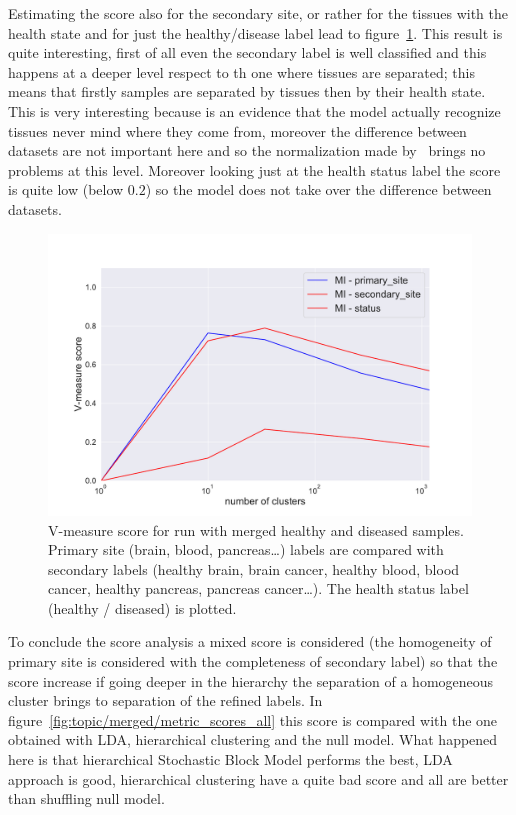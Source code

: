 Estimating the score also for the secondary site, or rather for the tissues with the health state and for just the healthy/disease label lead to figure~\ref{fig:topic/merged/metric_scores}. This result is quite interesting, first of all even the secondary label is well classified and this happens at a deeper level respect to th one where tissues are separated; this means that firstly samples are separated by tissues then by their health state. This is very interesting because is an evidence that the model actually recognize tissues never mind where they come from, moreover the difference between datasets are not important here and so the normalization made by~\cite{Betel2018} brings no problems at this level. Moreover looking just at the health status label the score is quite low (below $0.2$) so the model does not take over the difference between datasets.
\begin{figure}[htb!]
    \centering
    \includegraphics[width=0.8\linewidth]{pictures/topic/merged/metric_scores.pdf}
    \caption{V-measure score for run with merged healthy and diseased samples. Primary site (brain, blood, pancreas\ldots) labels are compared with secondary labels (healthy brain, brain cancer, healthy blood, blood cancer, healthy pancreas, pancreas cancer\ldots). The health status label (healthy / diseased) is plotted.}
    \label{fig:topic/merged/metric_scores}
\end{figure}
To conclude the score analysis a mixed score is considered (the homogeneity of primary site is considered with the completeness of secondary label) so that the score increase if going deeper in the hierarchy the separation of a homogeneous cluster brings to separation of the refined labels. In figure~\ref{fig:topic/merged/metric_scores_all} this score is compared with the one obtained with LDA, hierarchical clustering and the null model. What happened here is that hierarchical Stochastic Block Model performs the best, LDA approach is good, hierarchical clustering have a quite bad score and all are better than shuffling null model.
